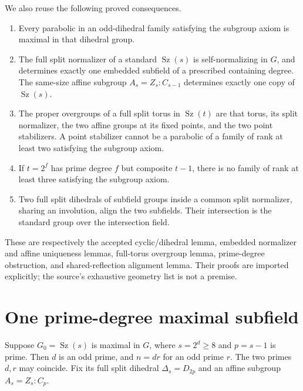 \documentclass[11pt,a4paper]{article}
\newcommand{\Sz}{\operatorname{Sz}}\newcommand{\gen}[1]{\langle#1\rangle}
\begin{document}
We also reuse the following proved consequences.
\begin{enumerate}
\item Every parabolic in an odd-dihedral family satisfying the subgroup
axiom is maximal in that dihedral group.
\item The full split normalizer of a standard $\Sz(s)$ is
self-normalizing in $G$, and determines exactly one embedded subfield
of a prescribed containing degree. The same-size affine subgroup
$A_s=Z_s:C_{s-1}$ determines exactly one copy of $\Sz(s)$.
\item The proper overgroups of a full split torus in $\Sz(t)$ are
that torus, its split normalizer, the two affine groups at its fixed
points, and the two point stabilizers. A point stabilizer cannot be
a parabolic of a family of rank at least two satisfying the subgroup
axiom.
\item If $t=2^f$ has prime degree $f$ but composite $t-1$, there is
no family of rank at least three satisfying the subgroup axiom.
\item Two full split dihedrals of subfield groups inside a common
split normalizer, sharing an involution, align the two subfields.
Their intersection is the standard group over the intersection field.
\end{enumerate}
These are respectively the accepted cyclic/dihedral lemma, embedded
normalizer and affine uniqueness lemmas, full-torus overgroup lemma,
prime-degree obstruction, and shared-reflection alignment lemma.
Their proofs are imported explicitly; the source's exhaustive geometry
list is not a premise.

\section{One prime-degree maximal subfield}
Suppose $G_0=\Sz(s)$ is maximal in $G$, where $s=2^d\ge8$ and
$p=s-1$ is prime. Then $d$ is an odd prime, and $n=dr$ for an odd
prime $r$. The two primes $d,r$ may coincide. Fix its full split
dihedral $\Delta_s=D_{2p}$ and an affine subgroup $A_s=Z_s:C_p$.
\end{document}
